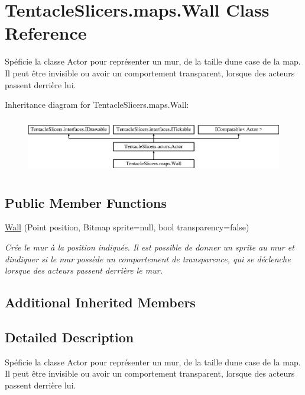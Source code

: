 \hypertarget{class_tentacle_slicers_1_1maps_1_1_wall}{}\section{Tentacle\+Slicers.\+maps.\+Wall Class Reference}
\label{class_tentacle_slicers_1_1maps_1_1_wall}


Spéficie la classe Actor pour représenter un mur, de la taille d\textquotesingle{}une case de la map. Il peut être invisible ou avoir un comportement transparent, lorsque des acteurs passent derrière lui.  


Inheritance diagram for Tentacle\+Slicers.\+maps.\+Wall\+:\begin{figure}[H]
\begin{center}
\leavevmode
\includegraphics[height=2.456140cm]{class_tentacle_slicers_1_1maps_1_1_wall}
\end{center}
\end{figure}
\subsection*{Public Member Functions}
\begin{DoxyCompactItemize}
\item 
\hyperlink{class_tentacle_slicers_1_1maps_1_1_wall_a3453d4554a9c80859f4c78eb67863e86}{Wall} (Point position, Bitmap sprite=null, bool transparency=false)
\begin{DoxyCompactList}\small\item\em Crée le mur à la position indiquée. Il est possible de donner un sprite au mur et d\textquotesingle{}indiquer si le mur possède un comportement de transparence, qui se déclenche lorsque des acteurs passent derrière le mur. \end{DoxyCompactList}\end{DoxyCompactItemize}
\subsection*{Additional Inherited Members}


\subsection{Detailed Description}
Spéficie la classe Actor pour représenter un mur, de la taille d\textquotesingle{}une case de la map. Il peut être invisible ou avoir un comportement transparent, lorsque des acteurs passent derrière lui. 




